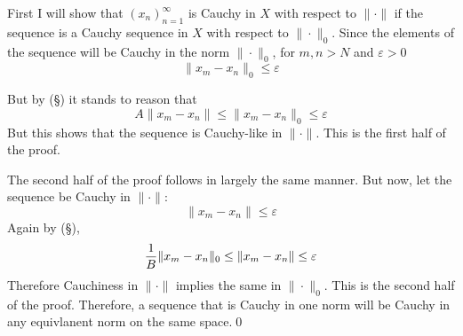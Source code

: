 First I will show that $(x_n)^\infty_{n=1}$ is Cauchy in $X$ with respect to $\|\cdot\|$ if the sequence is a Cauchy sequence in $X$ with respect to $\|\cdot\|_0$.
Since the elements of the sequence will be Cauchy in the norm $\|\cdot\|_0$, for $m,n>N$ and $\varepsilon>0$
$$\|x_m-x_n\|_0\leq\varepsilon$$
\eject


But by (\S) it stands to reason that
$$A\|x_m-x_n\|\leq\|x_m-x_n\|_0\leq\varepsilon$$
But this shows that the sequence is Cauchy-like in $\|\cdot\|$.
This is the first half of the proof.


The second half of the proof follows in largely the same manner.
But now, let the sequence be Cauchy in $\|\cdot\|$:
$$\|x_m-x_n\|\leq\varepsilon$$
Again by (\S),
$${1\over B}\|x_m-x_n\|_0\leq\|x_m-x_n\|\leq\varepsilon$$
Therefore Cauchiness in $\|\cdot\|$ implies the same in $\|\cdot\|_0$.
This is the second half of the proof.
Therefore, a sequence that is Cauchy in one norm will be Cauchy in any equivlanent norm on the same space.\hfill\qed
\bye
